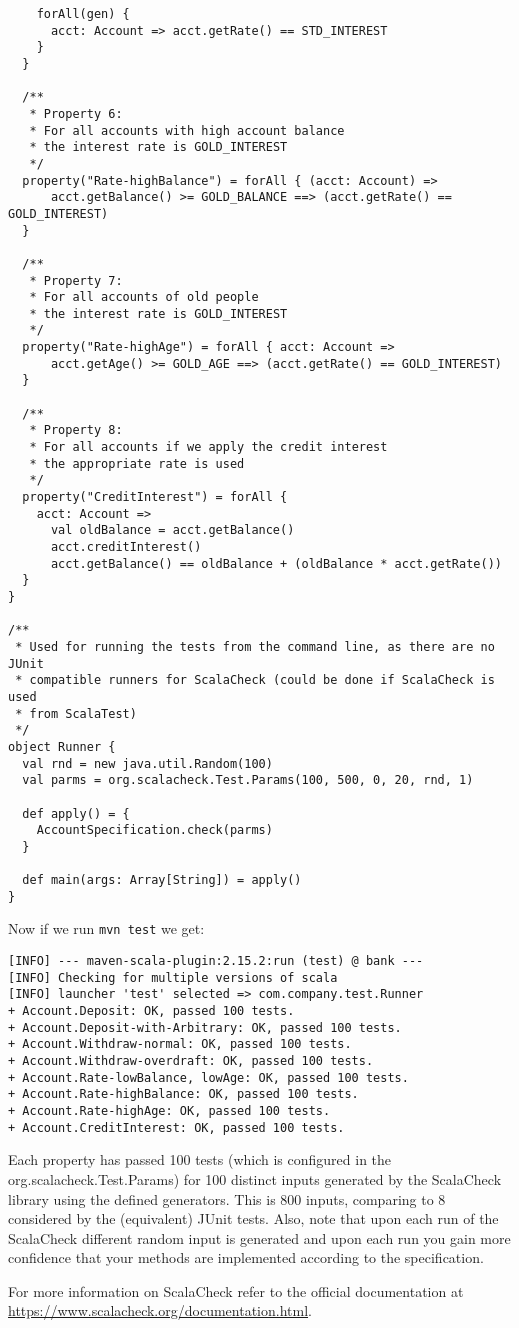 \documentclass{article}
\begin{document}
\begin{lstlisting}
    forAll(gen) {
      acct: Account => acct.getRate() == STD_INTEREST
    }
  }

  /**
   * Property 6:
   * For all accounts with high account balance
   * the interest rate is GOLD_INTEREST
   */
  property("Rate-highBalance") = forAll { (acct: Account) =>
      acct.getBalance() >= GOLD_BALANCE ==> (acct.getRate() == GOLD_INTEREST)
  }

  /**
   * Property 7:
   * For all accounts of old people 
   * the interest rate is GOLD_INTEREST
   */
  property("Rate-highAge") = forAll { acct: Account =>
      acct.getAge() >= GOLD_AGE ==> (acct.getRate() == GOLD_INTEREST)
  }

  /**
   * Property 8:
   * For all accounts if we apply the credit interest
   * the appropriate rate is used
   */
  property("CreditInterest") = forAll {
    acct: Account =>
      val oldBalance = acct.getBalance()
      acct.creditInterest()
      acct.getBalance() == oldBalance + (oldBalance * acct.getRate())
  }
}

/**
 * Used for running the tests from the command line, as there are no JUnit
 * compatible runners for ScalaCheck (could be done if ScalaCheck is used
 * from ScalaTest)
 */
object Runner {
  val rnd = new java.util.Random(100)
  val parms = org.scalacheck.Test.Params(100, 500, 0, 20, rnd, 1)

  def apply() = {
    AccountSpecification.check(parms)
  }

  def main(args: Array[String]) = apply()
}
\end{lstlisting}

Now if we run \texttt{mvn test} we get:

\begin{lstlisting}
[INFO] --- maven-scala-plugin:2.15.2:run (test) @ bank ---
[INFO] Checking for multiple versions of scala
[INFO] launcher 'test' selected => com.company.test.Runner
+ Account.Deposit: OK, passed 100 tests.
+ Account.Deposit-with-Arbitrary: OK, passed 100 tests.
+ Account.Withdraw-normal: OK, passed 100 tests.
+ Account.Withdraw-overdraft: OK, passed 100 tests.
+ Account.Rate-lowBalance, lowAge: OK, passed 100 tests.
+ Account.Rate-highBalance: OK, passed 100 tests.
+ Account.Rate-highAge: OK, passed 100 tests.
+ Account.CreditInterest: OK, passed 100 tests.
\end{lstlisting} 

Each property has passed 100 tests (which is configured in the
org.scalacheck.Test.Params) for 100 distinct inputs generated by the
ScalaCheck library using the defined generators. This is 800 inputs,
comparing to 8 considered by the (equivalent) JUnit tests.
Also, note that upon each run of the ScalaCheck different
random input is generated and upon each run you gain more confidence
that your methods are implemented according to the specification.

For more information on ScalaCheck refer to the official documentation
at \url{https://www.scalacheck.org/documentation.html}.
\end{document}
